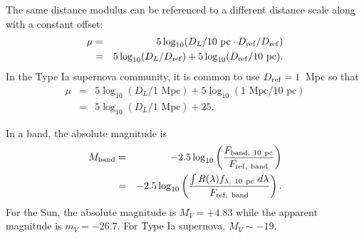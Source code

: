 The same distance modulus can be referenced to a different distance scale along with a constant offset:
\begin{eqnarray}
  \mu   &=& 5\log_{10}(D_L/\mbox{10 pc} \cdot D_{\rm ref}/D_{\rm ref}) \\ \nonumber
  &=&  5\log_{10}(D_L/D_{\rm ref}) +  5\log_{10}(D_{\rm ref}/\mbox{10 pc}).
\end{eqnarray}
In the Type Ia supernova community, it is common to use $D_{\rm ref} = 1$~Mpc so that 
\begin{eqnarray}
  \mu   &=&  5\log_{10}(D_L/\mbox{1 Mpc}) +  5\log_{10}(\mbox{1 Mpc}/\mbox{10 pc}) \\ \nonumber &=& 5\log_{10}(D_L/\mbox{1 Mpc}) + 25.
\end{eqnarray}
 

In a band, the absolute magnitude is
\begin{eqnarray}
  M_{\rm band} &=& -2.5 \log_{10} \left( \frac{F_{\rm band,\ 10 \ pc}}{F_{\rm ref, \ band}}  \right)  \\
  &=&   -2.5 \log_{10} \left( \frac{ \int R(\lambda) f_{\lambda,\ 10\ \rm pc}\ d\lambda}{F_{\rm ref, \ band}} \right).
\end{eqnarray}
For the Sun, the absolute magnitude is $M_V = +4.83$ while the apparent magnitude is $m_V = -26.7$.  For Type Ia supernova, $M_V \sim -19$.


